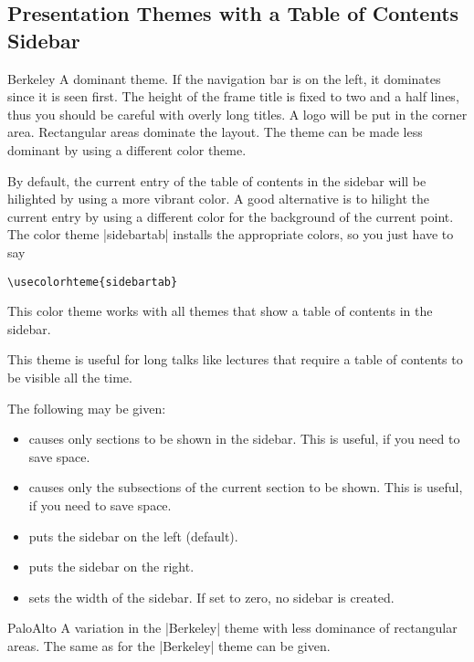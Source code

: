 \subsection{Presentation Themes with a Table of Contents Sidebar}

\begin{themeexample}{Berkeley}
  A dominant theme. If the navigation bar is on the left, it dominates
  since it is seen first. The height of the frame title is fixed to
  two and a half lines, thus you should be careful with overly long
  titles. A logo will be put in the corner area. Rectangular areas
  dominate the layout. The theme can be made less dominant by using a
  different color theme.

  By default, the current entry of the table of contents in the
  sidebar will be hilighted by using a more vibrant color. A good
  alternative is to hilight the current entry by using a different
  color for the background of the current point. The color theme
  |sidebartab| installs the appropriate colors, so you just have to
  say
\begin{verbatim}
\usecolorhteme{sidebartab}
\end{verbatim}
  This color theme works with all themes that show a table of contents
  in the sidebar.

  This theme is useful for long talks like lectures that require a
  table of contents to be visible all the time.

  The following  may be given:
  \begin{itemize}
  \item {} causes only sections to be
    shown in the sidebar. This is useful, if you need to save
    space.
  \item {} causes only the subsections
    of the current section to be shown. This is useful, if you need to
    save  space.      
  \item {} puts the sidebar on the left (default).
  \item {} puts the sidebar on the right.
  \item {} sets the width of the
    sidebar. If set to zero, no sidebar is created.
  \end{itemize}
\end{themeexample}

\begin{themeexample}{PaloAlto}
  A variation in the |Berkeley| theme with less dominance of
  rectangular areas. The same  as for the |Berkeley|
  theme can be given. 
\end{themeexample}

